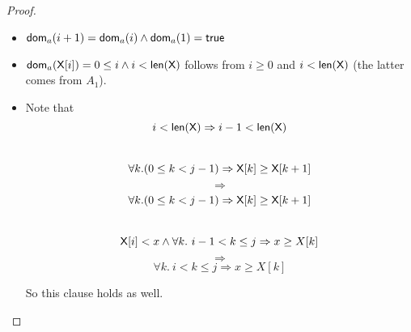 \begin{enumerate}[(a)]
\begin{enumerate}[i.]
\begin{proof}
        \begin{itemize}
        \item ${\sf dom}_a(i + 1) = {\sf dom}_a(i) \wedge {\sf dom}_a(1) = \textsf{true} $
        \item ${\sf dom}_a({\sf X}[i]) = 0 \leq i \wedge i < \textsf{len}(\textsf{X}) $ follows from
        $i \geq 0$ and $i < \textsf{len}(\textsf{X})$ (the latter comes from $A_1$).
        \item Note that
        $$i < \textsf{len}(\textsf{X}) \Rightarrow i - 1 < \textsf{len}(\textsf{X})$$ \\
        $$ \forall k. (0 \leq k < j - 1) \Rightarrow \textsf{X}[k] \geq \textsf{X}[k + 1] $$
        $$ \Rightarrow $$
        $$ \forall k. (0 \leq k < j - 1) \Rightarrow \textsf{X}[k] \geq \textsf{X}[k + 1] $$ \\
        $$ {\sf X}[i] < x \wedge \forall k .~i - 1 < k \leq j \Rightarrow  x \geq X[k] $$
        $$ \Rightarrow $$
        $$ \forall k .~i < k \leq j \Rightarrow  x \geq X[k] $$

        So this clause holds as well.



        \end{itemize}




    \end{proof}
    \end{enumerate}


\end{enumerate}
